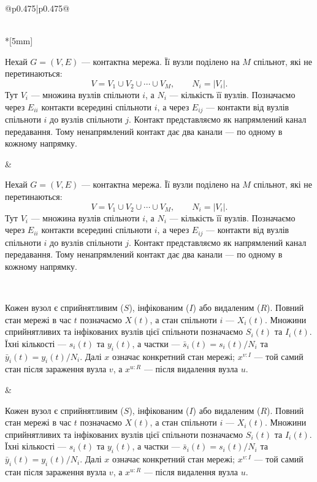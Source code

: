 \documentclass[11pt]{article}
\newcommand{\ibar}{\bar{y}}
\newcommand{\sbar}{\bar{s}}
\begin{document}
\begin{longtable}{@{}p{0.475\textwidth}|p{0.475\textwidth}@{}}
\begin{minipage}[t]{\linewidth}
\end{minipage} \\*[5mm]
\begin{minipage}[t]{\linewidth}
Нехай $G=(V,E)$ --- контактна мережа. Її вузли поділено на $M$ спільнот, які не перетинаються:
\begin{equation*}V=V_1\cup V_2\cup\cdots\cup V_M,
\qquad N_i=|V_i|.\tag{1}
\end{equation*}
Тут $V_i$ --- множина вузлів спільноти $i$, а $N_i$ --- кількість її вузлів. Позначаємо через $E_{ii}$ контакти всередині спільноти $i$, а через $E_{ij}$ --- контакти від вузлів спільноти $i$ до вузлів спільноти $j$. Контакт представляємо як напрямлений канал передавання. Тому ненапрямлений контакт дає два канали --- по одному в кожному напрямку.
\end{minipage} &
\begin{minipage}[t]{\linewidth}
Нехай $G=(V,E)$ --- контактна мережа. Її вузли поділено на $M$ спільнот, які не перетинаються:
\begin{equation*}V=V_1\cup V_2\cup\cdots\cup V_M,
\qquad N_i=|V_i|.\tag{1}
\end{equation*}
Тут $V_i$ --- множина вузлів спільноти $i$, а $N_i$ --- кількість її вузлів. Позначаємо через $E_{ii}$ контакти всередині спільноти $i$, а через $E_{ij}$ --- контакти від вузлів спільноти $i$ до вузлів спільноти $j$. Контакт представляємо як напрямлений канал передавання. Тому ненапрямлений контакт дає два канали --- по одному в кожному напрямку.
\end{minipage} \\[5mm]
\begin{minipage}[t]{\linewidth}
Кожен вузол є сприйнятливим ($S$), інфікованим ($I$) або видаленим ($R$). Повний стан мережі в час $t$ позначаємо $X(t)$, а стан спільноти $i$ --- $X_i(t)$. Множини сприйнятливих та інфікованих вузлів цієї спільноти позначаємо $S_i(t)$ та $I_i(t)$. Їхні кількості --- $s_i(t)$ та $y_i(t)$, а частки --- $\sbar_i(t)=s_i(t)/N_i$ та $\ibar_i(t)=y_i(t)/N_i$. Далі $x$ означає конкретний стан мережі; $x^{v:I}$ --- той самий стан після зараження вузла $v$, а $x^{u:R}$ --- після видалення вузла $u$.
\end{minipage} &
\begin{minipage}[t]{\linewidth}
Кожен вузол є сприйнятливим ($S$), інфікованим ($I$) або видаленим ($R$). Повний стан мережі в час $t$ позначаємо $X(t)$, а стан спільноти $i$ --- $X_i(t)$. Множини сприйнятливих та інфікованих вузлів цієї спільноти позначаємо $S_i(t)$ та $I_i(t)$. Їхні кількості --- $s_i(t)$ та $y_i(t)$, а частки --- $\sbar_i(t)=s_i(t)/N_i$ та $\ibar_i(t)=y_i(t)/N_i$. Далі $x$ означає конкретний стан мережі; $x^{v:I}$ --- той самий стан після зараження вузла $v$, а $x^{u:R}$ --- після видалення вузла $u$.

\end{minipage}
\end{longtable}
\end{document}
